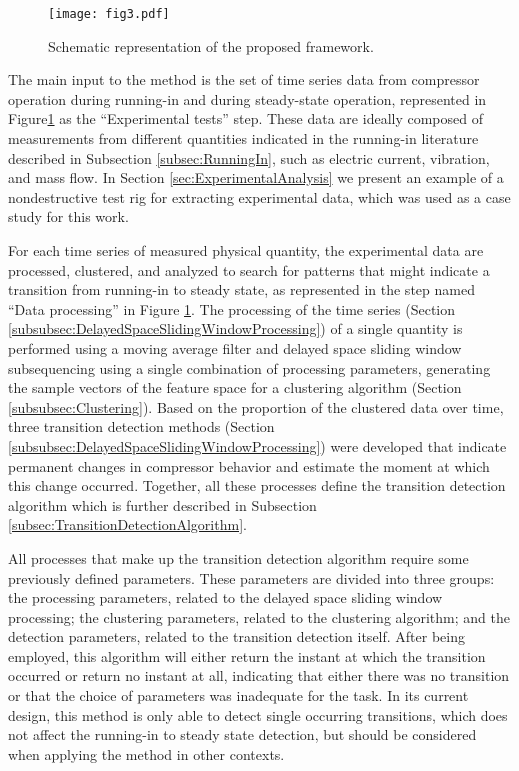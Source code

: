 \documentclass[preprint,11pt,number]{elsarticle}
\begin{document}
\begin{figure}[htb]
\begin{center}
\texttt{[image: fig3.pdf]}    %
\caption{ Schematic representation of the proposed framework.} 
\label{fig:diagramaMethod}
\end{center}
\end{figure}

The main input to the method is the set of time series data from compressor operation during running-in and during steady-state operation, represented in Figure\ref{fig:diagramaMethod} as the ``Experimental tests'' step. These data are ideally composed of measurements from different quantities indicated in the running-in literature described in Subsection \ref{subsec:RunningIn}, such as electric current, vibration, and mass flow. In Section \ref{sec:ExperimentalAnalysis} we present an example of a nondestructive test rig for extracting experimental data, which was used as a case study for this work.

For each time series of measured physical quantity, the experimental data are processed, clustered, and analyzed to search for patterns that might indicate a transition from running-in to steady state, as represented in the step named ``Data processing'' in Figure \ref{fig:diagramaMethod}. The processing of the time series (Section \ref{subsubsec:DelayedSpaceSlidingWindowProcessing}) of a single quantity is performed using a moving average filter and delayed space sliding window subsequencing using a single combination of processing parameters, generating the sample vectors of the feature space for a clustering algorithm (Section \ref{subsubsec:Clustering}). Based on the proportion of the clustered data over time, three transition detection methods (Section \ref{subsubsec:DelayedSpaceSlidingWindowProcessing}) were developed that indicate permanent changes in compressor behavior and estimate the moment at which this change occurred. Together, all these processes define the transition detection algorithm which is further described in Subsection \ref{subsec:TransitionDetectionAlgorithm}.

All processes that make up the transition detection algorithm require some previously defined parameters. These parameters are divided into three groups: the processing parameters, related to the delayed space sliding window processing; the clustering parameters, related to the clustering algorithm; and the detection parameters, related to the transition detection itself. After being employed, this algorithm will either return the instant at which the transition occurred or return no instant at all, indicating that either there was no transition or that the choice of parameters was inadequate for the task. In its current design, this method is only able to detect single occurring transitions, which does not affect the running-in to steady state detection, but should be considered when applying the method in other contexts.
\end{document}
